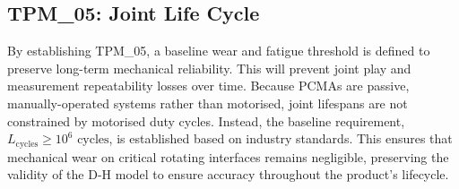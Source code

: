 \subsection{TPM\_05: Joint Life Cycle}

By establishing TPM\_05, a baseline wear and fatigue threshold is defined to preserve long-term mechanical reliability. This will prevent joint play and measurement repeatability losses over time. Because PCMAs are passive, manually-operated systems rather than motorised, joint lifespans are not constrained by motorised duty cycles. Instead, the baseline requirement, $L_{\text{cycles}} \ge 10^6\text{ cycles}$, is established based on industry standards. This ensures that mechanical wear on critical rotating interfaces remains negligible, preserving the validity of the D-H model to ensure accuracy throughout the product's lifecycle.
